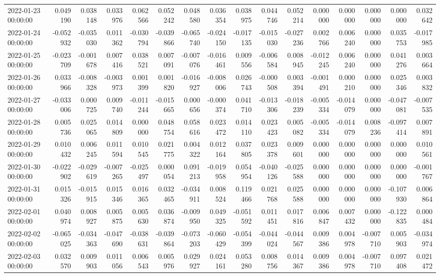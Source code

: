 \begin{tabular}{lrrrrrrrrrrrrrrr}
2022-01-23 00:00:00 & 0.049190 & 0.038148 & 0.033976 & 0.062566 & 0.052242 & 0.048580 & 0.036354 & 0.038975 & 0.044746 & 0.052214 & 0.000000 & 0.000000 & 0.000000 & 0.000000 & 0.032642 \\
2022-01-24 00:00:00 & -0.052932 & -0.035030 & 0.011362 & -0.030794 & -0.039866 & -0.065740 & -0.024150 & -0.017135 & -0.015030 & -0.027236 & 0.002766 & 0.006240 & 0.000000 & 0.035753 & -0.017985 \\
2022-01-25 00:00:00 & -0.023709 & -0.001678 & 0.007416 & 0.038521 & 0.007091 & -0.007076 & -0.016461 & 0.009556 & -0.006584 & 0.008945 & -0.012245 & 0.006240 & 0.000000 & 0.041276 & 0.003664 \\
2022-01-26 00:00:00 & 0.033966 & -0.008328 & -0.003973 & 0.001399 & 0.001820 & -0.016927 & -0.008006 & 0.026743 & -0.000508 & 0.003394 & -0.001491 & 0.000210 & 0.000000 & 0.025346 & 0.003832 \\
2022-01-27 00:00:00 & -0.033006 & 0.000725 & 0.009740 & -0.011244 & -0.015665 & 0.000656 & -0.000374 & 0.041710 & -0.013306 & -0.018239 & -0.005334 & -0.014079 & 0.000000 & -0.047081 & -0.007535 \\
2022-01-28 00:00:00 & 0.005736 & 0.025065 & 0.014809 & 0.000000 & 0.048754 & 0.058616 & 0.023472 & 0.014110 & 0.023423 & 0.005082 & -0.005334 & -0.014079 & 0.008236 & -0.097414 & 0.007891 \\
2022-01-29 00:00:00 & 0.010432 & 0.006245 & 0.011594 & 0.010545 & 0.021775 & 0.004322 & 0.012164 & 0.037805 & 0.023378 & 0.009601 & 0.000000 & 0.000000 & 0.000000 & 0.000000 & 0.010561 \\
2022-01-30 00:00:00 & -0.022902 & -0.029619 & -0.007265 & -0.025497 & 0.000054 & 0.091213 & -0.019958 & 0.054954 & -0.040126 & -0.025588 & 0.000000 & 0.000000 & 0.000000 & 0.000000 & -0.001767 \\
2022-01-31 00:00:00 & 0.015326 & -0.015915 & 0.015346 & 0.016365 & 0.032465 & -0.034911 & 0.008524 & 0.119466 & 0.021768 & 0.025588 & 0.000000 & 0.000000 & 0.000000 & -0.107930 & 0.006864 \\
2022-02-01 00:00:00 & 0.040974 & 0.008927 & 0.005875 & 0.005630 & 0.036874 & -0.009950 & 0.049325 & -0.051592 & 0.011451 & 0.017816 & 0.006847 & 0.007432 & 0.000000 & -0.122835 & 0.000484 \\
2022-02-02 00:00:00 & -0.065025 & -0.034363 & -0.047690 & -0.038631 & -0.039864 & -0.073203 & -0.060429 & -0.054399 & -0.044024 & -0.044567 & 0.009386 & 0.004978 & -0.007710 & 0.005903 & -0.034974 \\
2022-02-03 00:00:00 & 0.032570 & 0.009903 & 0.011056 & 0.006543 & 0.005976 & 0.029927 & 0.024161 & 0.053280 & 0.008756 & 0.014367 & 0.009386 & 0.004978 & -0.007710 & 0.097408 & 0.021472 \\

\end{tabular}

